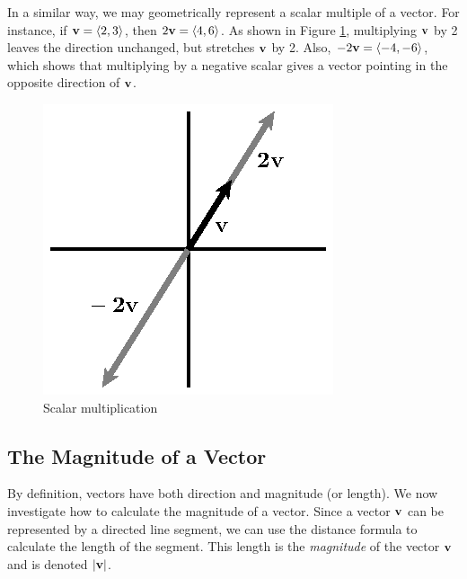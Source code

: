 In a similar way, we may geometrically represent a scalar multiple of a
vector.  For instance, if $\mathbf{v}=\langle 2,3\rangle$, then
$2\mathbf{v} = \langle 4,6\rangle$.  As shown in Figure
\ref{F:9.2.vector_sum7}, multiplying $\mathbf{v}$ by 2 leaves the direction
unchanged, but stretches $\mathbf{v}$ by 2.  Also, $-2\mathbf{v} = \langle -4,
-6\rangle$, which shows that multiplying by a negative scalar gives a
vector pointing in the opposite direction of $\mathbf{v}$.

\newpage

\begin{figure}[ht]
  \begin{center}
    \begin{minipage}{3in}
      \begin{center}
        \includegraphics{figures/fig_9_2_scalar.eps}
      \end{center}
      \caption{Scalar multiplication}
      \label{F:9.2.vector_sum7}
    \end{minipage}
  \end{center}
\end{figure}



\subsection*{The Magnitude of a Vector}

By definition, vectors have both direction and magnitude (or
length). We now investigate how to calculate the magnitude
of a vector.  Since a vector $\mathbf{v}$ can be represented
by a directed line segment, we can use the distance formula to
calculate the length of the segment. This length is the
\emph{magnitude} of the vector $\mathbf{v}$ and is denoted $|\mathbf{v}|$.

